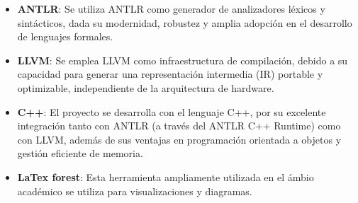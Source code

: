 \begin{itemize}
    \item \textbf{ANTLR}: Se utiliza ANTLR como generador de analizadores léxicos y sintácticos, dada su modernidad, robustez y amplia adopción en el desarrollo de lenguajes formales.

    \item \textbf{LLVM}: Se emplea LLVM como infraestructura de compilación, debido a su capacidad para generar una representación intermedia (IR) portable y optimizable, independiente de la arquitectura de hardware.

    \item \textbf{C++}: El proyecto se desarrolla con el lenguaje C++, por su excelente integración tanto con ANTLR (a través del ANTLR C++ Runtime) como con LLVM, además de sus ventajas en programación orientada a objetos y gestión eficiente de memoria.

    \item \textbf{LaTex forest}: Esta herramienta ampliamente utilizada en el ámbio académico se utiliza para visualizaciones y diagramas. 
\end{itemize}